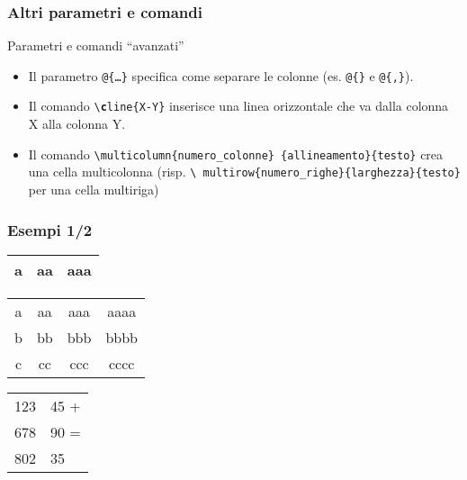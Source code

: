 \begin{frame}[fragile]
 
  \frametitle{Altri parametri e comandi}

  Parametri e comandi ``avanzati''
  
  \begin{itemize}
    \item Il parametro \texttt{@\{\dots\}} specifica come separare le colonne (es.
\texttt{@\{\}} e \texttt{@\{,\}}).
    \item Il comando \texttt{\textbackslash \textbf{c}line\{X-Y\}} inserisce una linea
orizzontale che va dalla colonna X alla colonna Y.
    \item Il comando \texttt{\textbackslash multicolumn\{numero\_colonne\}
\{allineamento\}\{testo\}} crea una cella multicolonna (risp. \texttt{\textbackslash
multirow\{numero\_righe\}\{larghezza\}\{testo\}} per una cella multiriga)
  \end{itemize}

\end{frame}

\begin{frame}
 
 \frametitle{Esempi 1/2}
  
  \begin{centering}

  \begin{tabular}{|p{}|l|p{2cm}|}
   \hline
   a & aa & aaa\\
   \hline
  \end{tabular}
  \vspace{1cm}

  \begin{tabular}{|c|c|c|c|}
   \hline
   a & aa & aaa & aaaa\\
   \cline{2-4}
   b & bb & bbb & bbbb\\
   \cline{3-4}
   c & cc & ccc & cccc\\
   \hline
  \end{tabular}
  \vspace{1cm}

  \begin{tabular}{l@{,}l@{}}
   123 & 45 + \\
   678 & 90 = \\
   \hline
   802 & 35
  \end{tabular}

  \end{centering}

\end{frame}
